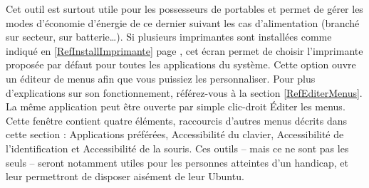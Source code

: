 Cet outil est surtout utile pour les possesseurs de portables et permet de gérer les modes d'économie d'énergie de ce dernier suivant les cas d'alimentation (branché sur secteur, sur batterie\ldots{}).
Si plusieurs imprimantes sont installées comme indiqué en \ref{RefInstallImprimante} page \pageref{RefInstallImprimante}, cet écran permet de choisir l'imprimante proposée par défaut pour toutes les applications du système.
Cette option ouvre un éditeur de menus afin que vous puissiez les personnaliser. Pour plus d'explications sur son fonctionnement, référez-vous à la section \ref{RefEditerMenus}. La même application peut être ouverte par simple clic-droit \FlecheDroite Éditer les menus.
Cette fenêtre contient quatre éléments, raccourcis d'autres menus décrits dans cette section : Applications préférées, Accessibilité du clavier, Accessibilité de l'identification et Accessibilité de la souris. Ces outils -- mais ce ne sont pas les seuls -- seront notamment utiles pour les personnes atteintes d'un handicap, et leur permettront de disposer aisément de leur Ubuntu.
